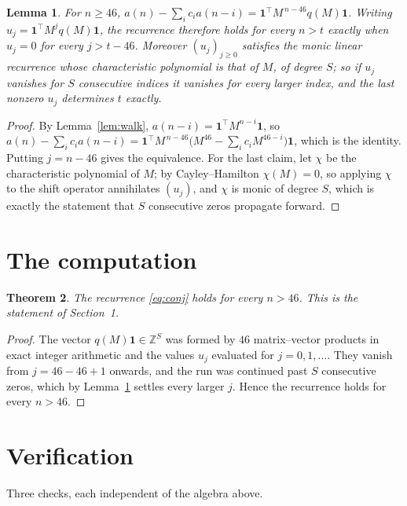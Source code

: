 \documentclass[11pt,a4paper]{article}
\theoremstyle{plain}
\newtheorem{theorem}{Theorem}
\newtheorem{lemma}[theorem]{Lemma}
\theoremstyle{definition}
\begin{document}
\begin{lemma}\label{lem:crit}
For $n\ge46$,
$a(n)-\sum_i c_i a(n-i)=\mathbf{1}^{\!\top}M^{\,n-46}q(M)\mathbf{1}$. Writing
$u_j=\mathbf{1}^{\!\top}M^{j}q(M)\mathbf{1}$, the recurrence therefore holds for every
$n>t$ exactly when $u_j=0$ for every $j>t-46$. Moreover $(u_j)_{j\ge0}$ satisfies the
monic linear recurrence whose characteristic polynomial is that of $M$, of degree $S$; so
if $u_j$ vanishes for $S$ consecutive indices it vanishes for every larger index, and the
last nonzero $u_j$ determines $t$ exactly.
\end{lemma}

\begin{proof}
By Lemma~\ref{lem:walk}, $a(n-i)=\mathbf{1}^{\!\top}M^{n-i}\mathbf{1}$, so
$a(n)-\sum_i c_i a(n-i)
=\mathbf{1}^{\!\top}M^{\,n-46}\bigl(M^{46}-\sum_i c_i M^{46-i}\bigr)
\mathbf{1}$, which is the identity. Putting $j=n-46$ gives the equivalence. For the
last claim, let $\chi$ be the characteristic polynomial of $M$; by Cayley--Hamilton
$\chi(M)=0$, so applying $\chi$ to the shift operator annihilates $(u_j)$, and $\chi$ is
monic of degree $S$, which is exactly the statement that $S$ consecutive zeros propagate
forward.
\end{proof}

\section{The computation}

\begin{theorem}
The recurrence \eqref{eq:conj} holds for every $n>46$. This is the statement of
Section~1.
\end{theorem}

\begin{proof}
The vector $q(M)\mathbf{1}\in\mathbb{Z}^{S}$ was formed by $46$ matrix--vector
products in exact integer arithmetic and the values $u_j$ evaluated for
$j=0,1,\dots$. They vanish from $j=46-46+1$ onwards, and the run was continued past
$S$ consecutive zeros, which by Lemma~\ref{lem:crit} settles every larger $j$. Hence the
recurrence holds for every $n>46$.
\end{proof}

\section{Verification}

Three checks, each independent of the algebra above.
\end{document}
